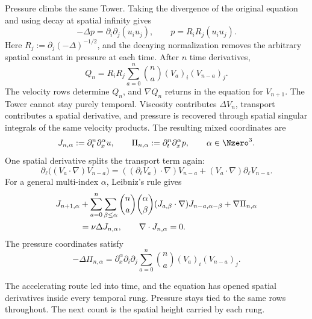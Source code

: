 Pressure climbs the same Tower.
Taking the divergence of the original equation and using decay at spatial infinity gives
\begin{equation}\label{eq:PressureNormalization}
  -\Delta p=\partial_i\partial_j(u_i u_j),
  \qquad
  p=R_iR_j(u_i u_j).
\end{equation}
Here \(R_j:=\partial_j(-\Delta)^{-1/2}\), and the decaying normalization removes the arbitrary spatial constant in pressure at each time.
After \(n\) time derivatives,
\begin{equation}\label{eq:BodyTemporalPressureRecurrence}
  Q_n
  =R_iR_j
  \sum_{a=0}^{n}\binom{n}{a}
  (V_a)_i(V_{n-a})_j.
\end{equation}
The velocity rows determine \(Q_n\), and \(\nabla Q_n\) returns in the equation for \(V_{n+1}\).
The Tower cannot stay purely temporal.
Viscosity contributes \(\Delta V_n\), transport contributes a spatial derivative, and pressure is recovered through spatial singular integrals of the same velocity products.
The resulting mixed coordinates are
\begin{equation}\label{eq:BodyMixedJetDefinition}
  J_{n,\alpha}:=\partial_t^n\partial_x^\alpha u,
  \qquad
  \Pi_{n,\alpha}:=\partial_t^n\partial_x^\alpha p,
  \qquad
  \alpha\in\Nzero^3.
\end{equation}
One spatial derivative splits the transport term again:
\[
  \partial_\ell\bigl((V_a\cdot\nabla)V_{n-a}\bigr)
  =((\partial_\ell V_a)\cdot\nabla)V_{n-a}
  +(V_a\cdot\nabla)\partial_\ell V_{n-a}.
\]
For a general multi-index \(\alpha\), Leibniz's rule gives
\begin{align}
  J_{n+1,\alpha}
  &+
  \sum_{a=0}^{n}
  \sum_{\beta\leq\alpha}
  \binom{n}{a}\binom{\alpha}{\beta}
  (J_{a,\beta}\cdot\nabla)
  J_{n-a,\alpha-\beta}
  +\nabla\Pi_{n,\alpha}
  \notag\\
  &=
  \nu\Delta J_{n,\alpha},
  \qquad
  \nabla\cdot J_{n,\alpha}=0.
  \label{eq:BodyMixedJetRecurrence}
\end{align}
The pressure coordinates satisfy
\begin{equation}\label{eq:BodyMixedPressureRecurrence}
  -\Delta\Pi_{n,\alpha}
  =
  \partial_x^\alpha\partial_i\partial_j
  \sum_{a=0}^{n}\binom{n}{a}
  (V_a)_i(V_{n-a})_j.
\end{equation}

The accelerating route led into time, and the equation has opened spatial derivatives inside every temporal rung.
Pressure stays tied to the same rows throughout.
The next count is the spatial height carried by each rung.
